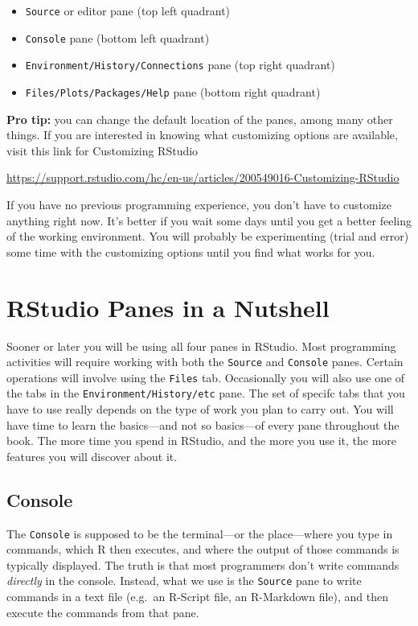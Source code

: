 \documentclass[
]{book}
\begin{document}
\begin{itemize}
\item
  \texttt{Source} or editor pane (top left quadrant)
\item
  \texttt{Console} pane (bottom left quadrant)
\item
  \texttt{Environment/History/Connections} pane (top right quadrant)
\item
  \texttt{Files/Plots/Packages/Help} pane (bottom right quadrant)
\end{itemize}

\textbf{Pro tip:} you can change the default location of the panes, among many other
things. If you are interested in knowing what customizing options are available,
visit this link for Customizing RStudio

\url{https://support.rstudio.com/hc/en-us/articles/200549016-Customizing-RStudio}

If you have no previous programming experience, you don't have to customize
anything right now. It's better if you wait some days until you get a better
feeling of the working environment. You will probably be experimenting (trial
and error) some time with the customizing options until you find what works for
you.

\hypertarget{rstudio-panes-in-a-nutshell}{%
\section{RStudio Panes in a Nutshell}\label{rstudio-panes-in-a-nutshell}}

Sooner or later you will be using all four panes in RStudio. Most programming
activities will require working with both the \texttt{Source} and \texttt{Console} panes.
Certain operations will involve using the \texttt{Files} tab. Occasionally you will
also use one of the tabs in the \texttt{Environment/History/etc} pane. The set of
specifc tabs that you have to use really depends on the type of work you plan
to carry out. You will have time to learn the basics---and not so basics---of
every pane throughout the book. The more time you spend in RStudio, and the
more you use it, the more features you will discover about it.

\hypertarget{console}{%
\subsection{Console}\label{console}}

The \texttt{Console} is supposed to be the terminal---or the place---where you type in
commands, which R then executes, and where the output of those commands is
typically displayed. The truth is that most programmers don't write commands
\emph{directly} in the console. Instead, what we use is the \texttt{Source} pane to write
commands in a text file (e.g.~an R-Script file, an R-Markdown file), and then
execute the commands from that pane.
\end{document}
